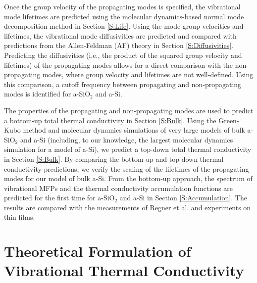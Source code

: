 \documentclass[aps,prb,onecolumn,preprint,superscriptaddress,footinbib,amsmath,amssymb,floatfix]{revtex4}
\begin{document}
Once the group velocity of the propagating modes is specified, 
the vibrational mode lifetimes are predicted using the
molecular dynamics-based normal 
mode decomposition method in Section \ref{S:Life}. 
Using the mode group velocities and lifetimes, the vibrational 
mode diffusivities are predicted and compared with 
predictions from the Allen-Feldman (AF) theory in 
Section \ref{S:Diffusivities}. Predicting the diffusivities 
(i.e., the product of the squared group velocity and lifetimes) 
of the propagating modes allows for a direct comparison 
with the non-propagating modes, where group velocity 
and lifetimes are not well-defined.\cite{allen_thermal_1993} 
Using this comparison, a cutoff frequency between 
propagating and non-propagating modes is identified 
for a-SiO$_2$ and a-Si.

The properties of the propagating and non-propagating 
modes are used to predict a bottom-up total thermal 
conductivity in Section \ref{S:Bulk}. 
Using the Green-Kubo method and 
molecular dynamics simulations of very large models of 
bulk a-SiO$_2$ and a-Si (including, to our 
knowledge, the largest molecular dynamics simulation for a 
model of a-Si\cite{barkema_high-quality_2000,he_heat_2011}), 
we predict a top-down total thermal conductivity in 
Section \ref{S:Bulk}. 
By comparing the bottom-up and top-down thermal 
conductivity predictions, we verify the scaling of the 
lifetimes of the propagating modes for our model of 
bulk a-Si. 
From the bottom-up approach, the spectrum of vibrational 
MFPs and the thermal conductivity accumulation functions 
are predicted for the first time 
for a-SiO$_2$ and a-Si in Section \ref{S:Accumulation}. The results 
are compared with the measurements of  
Regner et al.\cite{regner_broadband_2013} and experiments on 
thin films.\cite{freeman_thermal_1986,graebner_phonon_1986,
cahill_lattice_1988,cahill_thermal_1989,
love_estimate_1990,cahill_thermal_1994,lee_heat_1997,
yamane_measurement_2002,baldi_thermal_2008,
liu_high_2009,yang_anomalously_2010} 

\section{\label{S:Theory:Thermal}Theoretical Formulation of 
Vibrational Thermal Conductivity}
\end{document}
